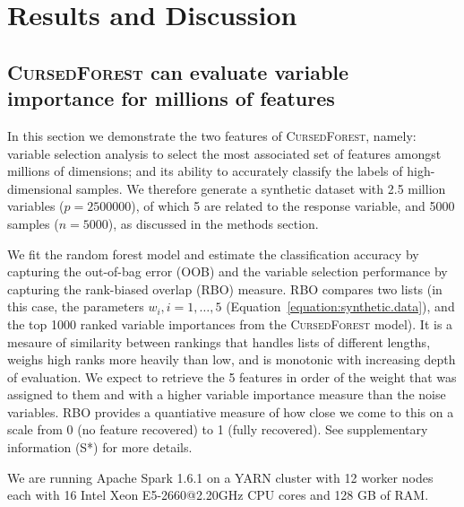\documentclass[10pt,letterpaper]{article}
\newcommand{\cursedforest}{\textsc{CursedForest}\xspace}
\begin{document}
%
%
\section{Results and Discussion}



\subsection{\cursedforest can evaluate variable importance for millions of features}
\label{section:synthetic}
In this section we demonstrate the two features of \cursedforest, namely: variable selection analysis to select the most
associated set of features amongst millions of dimensions; and its ability to accurately classify the labels of
high-dimensional samples.  We therefore generate a synthetic dataset with 2.5 million variables ($p=2500000$), of which 5 
are related to the response variable, and 5000 samples ($n=5000$), as discussed in the methods section.

We fit the random forest model and estimate the classification accuracy by capturing the out-of-bag error (OOB) and the
variable selection performance by capturing the rank-biased overlap (RBO) \cite{Webber2010} measure. RBO compares two
lists (in this case, the parameters $w_i, i=1,\ldots , 5$ (Equation~\ref{equation:synthetic.data}), and the top 1000
ranked variable importances from the \cursedforest model). It is a mesaure of similarity between rankings that handles
lists of different lengths, weighs high ranks more heavily than low, and is monotonic with increasing depth of
evaluation. We expect to retrieve the 5 features in order of the weight that was assigned to them and with a higher
variable importance measure than the noise variables. RBO provides a quantiative measure of how close we come to this on
a scale from 0 (no feature recovered) to 1 (fully recovered). See supplementary information (S*) for more details.

We are running Apache Spark 1.6.1 on a YARN
cluster with 12 worker nodes each with 16 Intel Xeon E5-2660@2.20GHz CPU cores and 128 GB of RAM.


\end{document}
